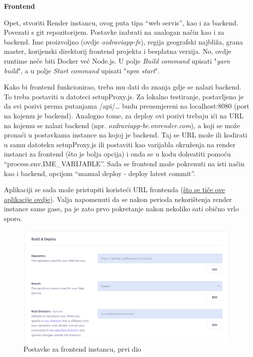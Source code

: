 			 \textbf{Frontend}
			 
			 Opet, stvoriti Render instancu, ovog puta tipa “web servis”, kao i za backend. Povezati s git repozitorijem. Postavke izabrati na analogan način kao i za backend. Ime proizvoljno (ovdje \textit{ozdraviapp-fe}), regija geografski najbliža, grana master, korijenski direktorij frontend projekta i besplatna verzija. No, ovdje runtime neće biti Docker već Node.js. U polje \textit{Build command} upisati "\textit{yarn build}", a u polje \textit{Start command} upisati "\textit{npm start}".
			 
			 Kako bi frontend funkcionirao, treba mu dati do znanja gdje se nalazi backend. To treba postaviti u datoteci setupProxy.js. Za lokalno testiranje, postavljeno je da svi pozivi prema putanjama /api/… budu preusmjereni na localhost:8080 (port na kojemu je backend). Analogno tome, za deploy ovi pozivi trebaju ići na URL na kojemu se nalazi backend (npr. \textit{ozdraviapp-be.onrender.com}), a koji se može pronaći u postavkama instance na kojoj je backend.
			 Taj se URL može ili kodirati u samu datoteku setupProxy.js ili postaviti kao varijabla okruženja na render instanci za frontend (što je bolja opcija) i onda se u kodu dohvatiti pomoću “process.env.IME\_VARIJABLE”. Sada se frontend može pokrenuti na isti način kao i backend, opcijom “manual deploy - deploy latest commit”.
			 
			 Aplikaciji se sada može pristupiti koristeći URL frontenda (\href{ozdraviapp-fe.onrender.com}{što se tiče ove aplikacije ovdje}). Valja napomenuti da se nakon perioda nekorištenja render instance same gase, pa je zato prvo pokretanje nakon nekoliko sati obično vrlo sporo.
			
			 \begin{figure}[H]
				\includegraphics[width=\textwidth]{slike/feDeploy1.png} %
				\caption{Postavke za frontend instancu, prvi dio}
				\label{fig:feDeploy1} %
			 \end{figure}

